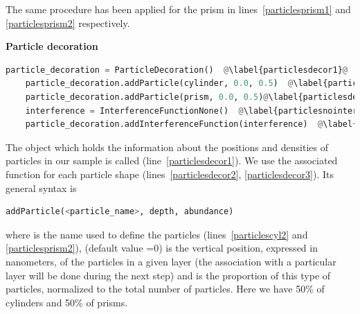 \noindent The same procedure has been applied for the prism in lines~\ref{particlesprism1} and \ref{particlesprism2} respectively.

\noindent \textbf{Particle decoration} \\
  

\begin{lstlisting}[language=python, style=eclipseboxed, name=ex1,nolol]
    particle_decoration = ParticleDecoration()  @\label{particlesdecor1}@
    particle_decoration.addParticle(cylinder, 0.0, 0.5)  @\label{particlesdecor2}@
    particle_decoration.addParticle(prism, 0.0, 0.5)@\label{particlesdecor3}@
    interference = InterferenceFunctionNone()  @\label{particlesnointerf}@
    particle_decoration.addInterferenceFunction(interference)  @\label{particlesinterf}@
\end{lstlisting}

\noindent The object which holds the information about the positions and densities of particles
in our sample is called 
(line~\ref{particlesdecor1}). We use the associated function 
for each particle shape (lines~\ref{particlesdecor2}, \ref{particlesdecor3}). Its general
syntax is 

\begin{lstlisting}[language=python, style=eclipse,numbers=none]
addParticle(<particle_name>, depth, abundance) 
\end{lstlisting}

\noindent  where  is the name used to define the particles
(lines~\ref{particlescyl2} and \ref{particlesprism2}), 
(default value =0)
is the vertical position, expressed in nanometers, of the particles in a given layer (the
association with a particular layer will be done during the next step) and
 is the proportion of this type of particles, 
normalized to the total number of particles. Here we have 50\% of cylinders
and 50\% of prisms. \\ 

\\


